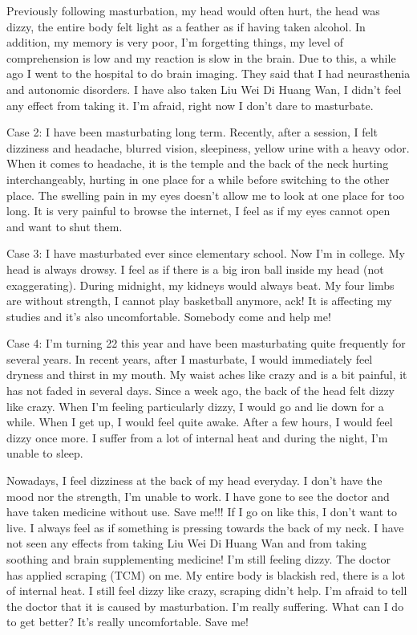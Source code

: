 \documentclass[
]{book}
\begin{document}
Previously following masturbation, my head would often hurt, the head was dizzy, the entire body felt light as a feather as if having taken alcohol. In addition, my memory is very poor, I'm forgetting things, my level of comprehension is low and my reaction is slow in the brain. Due to this, a while ago I went to the hospital to do brain imaging. They said that I had neurasthenia and autonomic disorders. I have also taken Liu Wei Di Huang Wan, I didn't feel any effect from taking it. I'm afraid, right now I don't dare to masturbate.

Case 2: I have been masturbating long term. Recently, after a session, I felt dizziness and headache, blurred vision, sleepiness, yellow urine with a heavy odor. When it comes to headache, it is the temple and the back of the neck hurting interchangeably, hurting in one place for a while before switching to the other place. The swelling pain in my eyes doesn't allow me to look at one place for too long. It is very painful to browse the internet, I feel as if my eyes cannot open and want to shut them.

Case 3: I have masturbated ever since elementary school. Now I'm in college. My head is always drowsy. I feel as if there is a big iron ball inside my head (not exaggerating). During midnight, my kidneys would always beat. My four limbs are without strength, I cannot play basketball anymore, ack! It is affecting my studies and it's also uncomfortable. Somebody come and help me!

Case 4: I'm turning 22 this year and have been masturbating quite frequently for several years. In recent years, after I masturbate, I would immediately feel dryness and thirst in my mouth. My waist aches like crazy and is a bit painful, it has not faded in several days. Since a week ago, the back of the head felt dizzy like crazy. When I'm feeling particularly dizzy, I would go and lie down for a while. When I get up, I would feel quite awake. After a few hours, I would feel dizzy once more. I suffer from a lot of internal heat and during the night, I'm unable to sleep.

Nowadays, I feel dizziness at the back of my head everyday. I don't have the mood nor the strength, I'm unable to work. I have gone to see the doctor and have taken medicine without use. Save me!!! If I go on like this, I don't want to live. I always feel as if something is pressing towards the back of my neck. I have not seen any effects from taking Liu Wei Di Huang Wan and from taking soothing and brain supplementing medicine! I'm still feeling dizzy. The doctor has applied scraping (TCM) on me. My entire body is blackish red, there is a lot of internal heat. I still feel dizzy like crazy, scraping didn't help. I'm afraid to tell the doctor that it is caused by masturbation. I'm really suffering. What can I do to get better? It's really uncomfortable. Save me!
\end{document}
